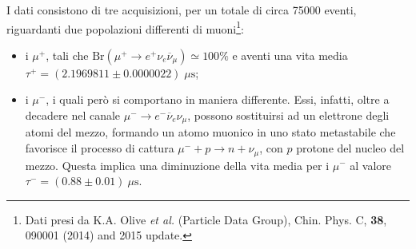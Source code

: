 \documentclass[11pt, oneside, a4paper]{article}   	%
\begin{document}
I dati consistono di tre acquisizioni, per un totale di circa 75000 eventi, riguardanti due popolazioni differenti di muoni\footnote{Dati presi da K.A. Olive \emph{et al.} (Particle Data Group), Chin. Phys. C, \textbf{38}, 090001 (2014) and 2015 update.}:
\begin{itemize}
	\item i $\mu^+$, tali che $\mbox{Br}(\mu^+ \to e^+\nu_e\overline{\nu}_\mu)\simeq 100 \%$ e aventi una vita media \linebreak $\tau^+=(2.1969811 \pm 0.0000022)\;\mu\mbox{s}$;
\item i $\mu^-$, i quali però si comportano in maniera differente. Essi, infatti, oltre a decadere nel canale $\mu^-\to e^-\overline{\nu}_e\nu_\mu$, possono sostituirsi ad un elettrone degli atomi del mezzo, formando un atomo muonico in uno stato metastabile che favorisce il processo di cattura $\mu^-+p\to n+\nu_\mu $, con $p$ protone del nucleo del mezzo. Questa implica una diminuzione della vita media per i $\mu^-$ al valore $\tau^-=(0.88 \pm 0.01) \ \mu \mbox{s}$.
\end{itemize}
\end{document}
